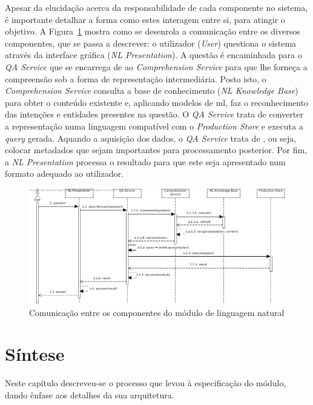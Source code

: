 Apesar da elucidação acerca da responsabilidade de cada componente no sistema, é importante detalhar a forma como estes interagem entre si, para atingir o objetivo. A Figura~\ref{fig:model_sequence_diagram} mostra como se desenrola a comunicação entre os diversos componentes, que se passa a descrever: o utilizador (\textit{User}) questiona o sistema através da interface gráfica (\textit{NL Presentation}). A questão é encaminhada para o \textit{QA Service} que se encarrega de  ao \textit{Comprehension Service} para que lhe forneça a compreensão sob a forma de representação intermediária. Posto isto, o \textit{Comprehension Service} consulta a base de conhecimento (\textit{NL Knowledge Base}) para obter o conteúdo existente e, aplicando modelos de \gls{ml}, faz o reconhecimento das intenções e entidades presentes na questão. O \textit{QA Service} trata de converter a representação numa linguagem compatível com o \textit{Production Store} e executa a \textit{query} gerada. Aquando a aquisição dos dados, o \textit{QA Service} trata de , ou seja, colocar metadados que sejam importantes para processamento posterior. Por fim, a \textit{NL Presentation} processa o resultado para que este seja apresentado num formato adequado ao utilizador.

\begin{figure}
    \centering
    \includegraphics[width=\textwidth]{ch04/assets/workflow.jpg}
    \caption{Comunicação entre os componentes do módulo de linguagem natural}
    \label{fig:model_sequence_diagram}
\end{figure}

\section{Síntese} 
\label{sec:chap04_chaptersummary}
Neste capítulo descreveu-se o processo que levou à especificação do módulo, dando ênfase aos detalhes da sua arquitetura. 

